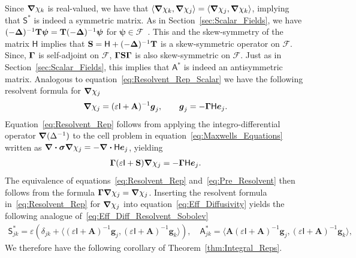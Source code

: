 \documentclass[leqno,onefignum,onetabnum]{siamltex1213}
\newcommand{\secref}[1]{Section~\ref{#1}}
\newcommand{\thmref}[1]{Theorem~\ref{#1}}
\newcommand{\Mb}{\mathbf{M}}
\newcommand{\Tb}{\mathbf{T}}
\newcommand{\Sb}{\mathbf{S}}
\newcommand{\Ab}{\mathbf{A}}
\newcommand{\Fc}{\mathcal{F}}
\newcommand{\Hm}{\mathsf{H}}
\newcommand{\Sm}{\mathsf{S}}
\newcommand{\Am}{\mathsf{A}}
\newcommand{\Ib}{\mathsf{I}}
\newcommand\bsig{\mbox{\boldmath${\sigma}$}}
\newcommand\bDelta{\mbox{\boldmath${\Delta}$}}
\newcommand\bGamma{\mbox{\boldmath${\Gamma}$}}
\newcommand\bnabla{\mbox{\boldmath${\nabla}$}}
\providecommand\bcdot{\boldsymbol{\cdot}}
\newcommand{\vecg}{\boldsymbol{g}}
\newcommand{\vece}{\boldsymbol{e}}
\newcommand{\vecpsi}{\boldsymbol{\psi}}
\begin{document}
Since $\bnabla\chi_k$ is real-valued, we have that
$\langle\bnabla\chi_k,\bnabla\chi_j\rangle=\langle\bnabla\chi_j,\bnabla\chi_k\rangle$, implying that
$\Sm^*$ is indeed a symmetric matrix. As in
\secref{sec:Scalar_Fields}, we have
$(-\bDelta)^{-1}\Tb\vecpsi=\Tb(-\bDelta)^{-1}\vecpsi$ for
$\vecpsi\in\Fc$~\cite{Folland:99:RealAnalysis,Stakgold:BVP:2000}. This
and the skew-symmetry of the matrix $\Hm$ implies that
$\Sb=\Hm+(-\bDelta)^{-1}\Tb$ is a skew-symmetric operator on
$\Fc$. Since, $\bGamma$ is self-adjoint on $\Fc$, $\bGamma\Sb\bGamma$
is also skew-symmetric on $\Fc$. Just as in
\secref{sec:Scalar_Fields}, this implies that $\Am^*$ is indeed an
antisymmetric matrix. Analogous to
equation~\eqref{eq:Resolvent_Rep_Scalar} we have the following
resolvent formula for $\bnabla\chi_j$
% 
\begin{align}\label{eq:Resolvent_Rep}
  \bnabla \chi_j=(\varepsilon\Ib+\Ab)^{-1}\vecg_j,
  \qquad
  \vecg_j=-\bGamma\Hm\vece_j.
\end{align}
%
Equation~\eqref{eq:Resolvent_Rep} follows from
applying the integro-differential operator $\bnabla (\Delta^{-1})$ to the
cell problem in equation~\eqref{eq:Maxwells_Equations} written as 
$\bnabla\bcdot\bsig\bnabla\chi_j=-\bnabla\bcdot\Hm\vece_j$, yielding  
%
\begin{align}\label{eq:Pre_Resolvent}
  \bGamma(\varepsilon\Ib+\Sb)\bnabla \chi_j=-\bGamma\Hm\vece_j.
\end{align}
%
The equivalence of equations~\eqref{eq:Resolvent_Rep}
and~\eqref{eq:Pre_Resolvent} then follows from the formula
$\bGamma\bnabla\chi_j=\bnabla\chi_j$. Inserting the resolvent formula
in~\eqref{eq:Resolvent_Rep} for $\bnabla\chi_j$ into
equation~\eqref{eq:Eff_Diffusivity} yields the following analogue
of~\eqref{eq:Eff_Diff_Resolvent_Sobolev} 
%
\begin{align}\label{eq:Eff_Diff_Resolvent}
 \Sm^*_{jk}=\varepsilon\left(\delta_{jk}+\langle(\varepsilon\Ib+\Ab)^{-1}\vecg_j,(\varepsilon\Ib+\Ab)^{-1}\vecg_k\rangle\right), \quad
 \Am^*_{jk}=\langle\Ab(\varepsilon\Ib+\Ab)^{-1}\vecg_j,(\varepsilon\Ib+\Ab)^{-1}\vecg_k\rangle,
\end{align}
%
We therefore have the following corollary of \thmref{thm:Integral_Reps}.
%
\end{document}
